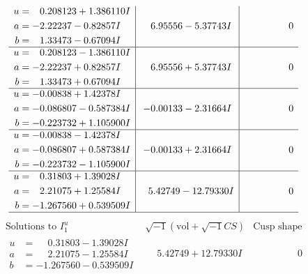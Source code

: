 \documentclass[1p]{elsarticle_modified}
\theoremstyle{definition}
\newcommand{\I}{\sqrt{-1}}
\begin{document}
$$\begin{array}{c|c|c}
\begin{aligned}
u &= \phantom{-}0.208123 + 1.386110 I \\
a &= -2.22237 - 0.82857 I \\
b &= \phantom{-}1.33473 - 0.67094 I\end{aligned}
 & \phantom{-}6.95556 - 5.37743 I & \phantom{-0.000000 } 0 \\ \hline\begin{aligned}
u &= \phantom{-}0.208123 - 1.386110 I \\
a &= -2.22237 + 0.82857 I \\
b &= \phantom{-}1.33473 + 0.67094 I\end{aligned}
 & \phantom{-}6.95556 + 5.37743 I & \phantom{-0.000000 } 0 \\ \hline\begin{aligned}
u &= -0.00838 + 1.42378 I \\
a &= -0.086807 - 0.587384 I \\
b &= -0.223732 + 1.105900 I\end{aligned}
 & -0.00133 - 2.31664 I & \phantom{-0.000000 } 0 \\ \hline\begin{aligned}
u &= -0.00838 - 1.42378 I \\
a &= -0.086807 + 0.587384 I \\
b &= -0.223732 - 1.105900 I\end{aligned}
 & -0.00133 + 2.31664 I & \phantom{-0.000000 } 0 \\ \hline\begin{aligned}
u &= \phantom{-}0.31803 + 1.39028 I \\
a &= \phantom{-}2.21075 + 1.25584 I \\
b &= -1.267560 + 0.539509 I\end{aligned}
 & \phantom{-}5.42749 - 12.79330 I & \phantom{-0.000000 } 0\\
 \hline 
 \end{array}$$\newpage$$\begin{array}{c|c|c}  
\text{Solutions to }I^u_{1}& \I (\text{vol} + \sqrt{-1}CS) & \text{Cusp shape}\\
 \hline 
\begin{aligned}
u &= \phantom{-}0.31803 - 1.39028 I \\
a &= \phantom{-}2.21075 - 1.25584 I \\
b &= -1.267560 - 0.539509 I\end{aligned}
 & \phantom{-}5.42749 + 12.79330 I & \phantom{-0.000000 } 0 \\ \hline\begin{aligned}

\end{aligned}
\end{array}$$
\end{document}
